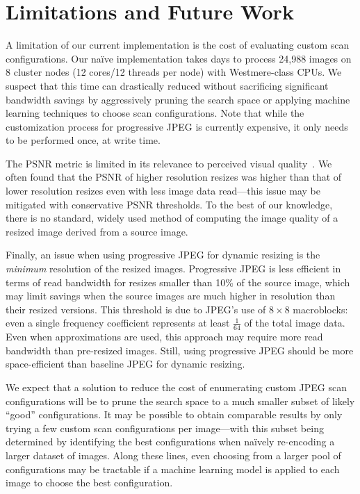 \section{Limitations and Future Work}
A limitation of our current implementation is the cost of evaluating custom scan configurations.
Our na\"{i}ve implementation takes days to process 24,988 images on 8 cluster nodes (12 cores/12 threads per node) with Westmere-class CPUs. 
We suspect that this time can drastically reduced without sacrificing significant bandwidth savings by aggressively pruning the search space or applying machine learning techniques to choose scan configurations.
Note that while the customization process for progressive JPEG is currently expensive, it only needs to be performed once, at write time. 

The PSNR metric is limited in its relevance to perceived visual quality~\cite{wang2002no}.
We often found that the PSNR of higher resolution resizes was higher than that of lower resolution resizes even with less image data read---this issue may be mitigated with conservative PSNR thresholds.
To the best of our knowledge, there is no standard, widely used method of computing the image quality of a resized image derived from a source image.

Finally, an issue when using progressive JPEG for dynamic resizing is the \emph{minimum} resolution of the resized images.
Progressive JPEG is less efficient in terms of read bandwidth for resizes smaller than 10\% of the source image, which may limit savings when the source images are much higher in resolution than their resized versions.
This threshold is due to JPEG's use of $8\times8$ macroblocks: even a single frequency coefficient represents at least $\frac{1}{64}$ of the total image data.
Even when approximations are used, this approach may require more read bandwidth than pre-resized images.
Still, using progressive JPEG should be more space-efficient than baseline JPEG for dynamic resizing.

We expect that a solution to reduce the cost of enumerating custom JPEG scan configurations will be to prune the search space to a much smaller subset of likely ``good'' configurations.
It may be possible to obtain comparable results by only trying a few custom scan
configurations per image---with this subset being determined by identifying the best configurations when na\"{i}vely re-encoding a larger dataset of images.
Along these lines, even choosing from a larger pool of configurations may be tractable if a machine learning model is applied to each image to choose the best configuration.
